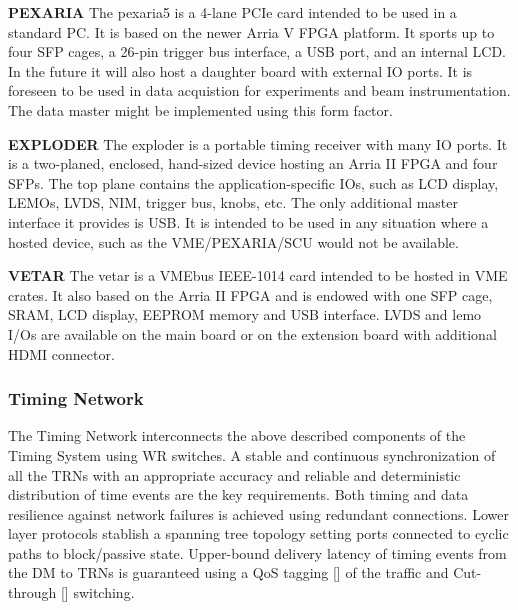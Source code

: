 \textbf{PEXARIA}
The pexaria5 is a 4-lane PCIe card intended to be used in a standard PC.
It is based on the newer Arria V FPGA platform.
It sports up to four SFP cages, a 26-pin trigger bus interface,
a USB port, and an internal LCD.
In the future it will also host a daughter board with external IO
ports.
It is foreseen to be used in data acquistion for experiments
and beam instrumentation.
The data master might be implemented using this form factor.

\textbf{EXPLODER}
The exploder is a portable timing receiver with many IO ports.
It is a two-planed, enclosed, hand-sized device 
hosting an Arria II FPGA and four SFPs.
The top plane contains the application-specific IOs,
such as LCD display, LEMOs, LVDS, NIM, trigger bus, knobs, etc.
The only additional master interface it provides is USB.
It is intended to be used in any situation where a hosted device,
such as the VME/PEXARIA/SCU would not be available.

\textbf{VETAR}
The vetar is a VMEbus IEEE-1014 card intended to be hosted in VME crates.
It also based on the Arria II FPGA and is endowed with one SFP cage, SRAM, LCD
display, EEPROM memory and USB interface. LVDS and lemo I/Os are available on the main 
board or on the extension board with additional HDMI connector.

\subsubsection{Timing Network}

The Timing Network interconnects the above described components of the Timing
System using WR switches. A stable and continuous synchronization of all the
TRNs with an appropriate accuracy and reliable and deterministic distribution 
of time events are the key requirements. 
Both timing and data resilience against network failures is achieved 
using redundant connections. Lower layer protocols
stablish a spanning tree topology setting ports connected to
cyclic paths to block/passive state. Upper-bound delivery latency of timing events 
from the DM to TRNs is guaranteed using a QoS tagging [] of the traffic and Cut-through [] switching.


